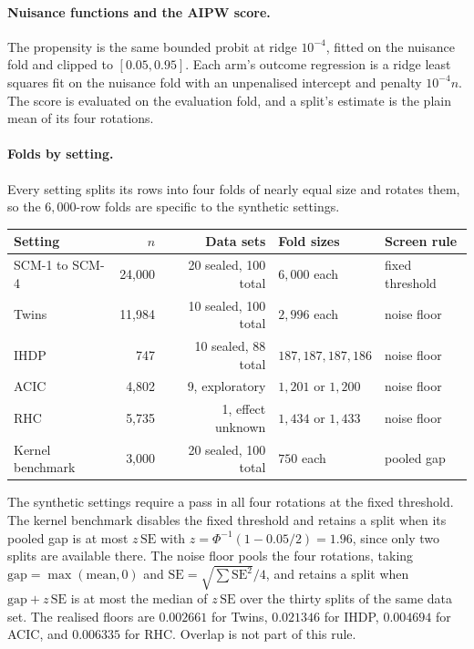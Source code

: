 {\paragraph{Nuisance functions and the AIPW score.} The propensity is the same bounded probit at ridge $10^{-4}$, fitted on the nuisance fold and clipped to $[0.05,0.95]$. Each arm's outcome regression is a ridge least squares fit on the nuisance fold with an unpenalised intercept and penalty $10^{-4}n$. The score is evaluated on the evaluation fold, and a split's estimate is the plain mean of its four rotations.

\paragraph{Folds by setting.} Every setting splits its rows into four folds of nearly equal size and rotates them, so the $6{,}000$-row folds are specific to the synthetic settings.

\begin{center}
\footnotesize
\begin{tabular}{lrrll}
\toprule
Setting & $n$ & Data sets & Fold sizes & Screen rule \\
\midrule
SCM-1 to SCM-4 & 24,000 & 20 sealed, 100 total & $6{,}000$ each & fixed threshold \\
Twins & 11,984 & 10 sealed, 100 total & $2{,}996$ each & noise floor \\
IHDP & 747 & 10 sealed, 88 total & $187,187,187,186$ & noise floor \\
ACIC & 4,802 & 9, exploratory & $1{,}201$ or $1{,}200$ & noise floor \\
RHC & 5,735 & 1, effect unknown & $1{,}434$ or $1{,}433$ & noise floor \\
Kernel benchmark & 3,000 & 20 sealed, 100 total & $750$ each & pooled gap \\
\bottomrule
\end{tabular}
\end{center}

The synthetic settings require a pass in all four rotations at the fixed threshold. The kernel benchmark disables the fixed threshold and retains a split when its pooled gap is at most $z\,\mathrm{SE}$ with $z=\Phi^{-1}(1-0.05/2)=1.96$, since only two splits are available there. The noise floor pools the four rotations, taking $\mathrm{gap}=\max(\mathrm{mean},0)$ and $\mathrm{SE}=\sqrt{\sum\mathrm{SE}^2}/4$, and retains a split when $\mathrm{gap}+z\,\mathrm{SE}$ is at most the median of $z\,\mathrm{SE}$ over the thirty splits of the same data set. The realised floors are $0.002661$ for Twins, $0.021346$ for IHDP, $0.004694$ for ACIC, and $0.006335$ for RHC. Overlap is not part of this rule.

}
